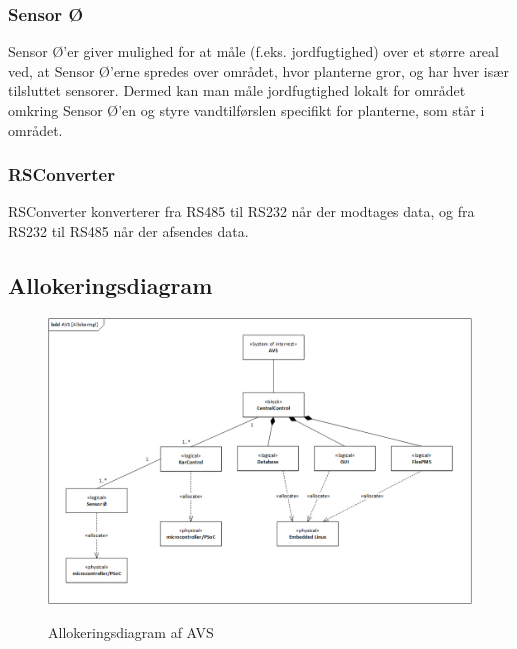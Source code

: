 \subsubsection{Sensor Ø}
Sensor Ø’er giver mulighed for at måle (f.eks. jordfugtighed) over et større areal ved, at Sensor Ø’erne spredes over området, hvor planterne gror, og har hver især tilsluttet sensorer. Dermed kan man måle jordfugtighed lokalt for området omkring Sensor Ø’en og styre vandtilførslen specifikt for planterne, som står i området.

\subsubsection{RSConverter}
RSConverter konverterer fra RS485 til RS232 når der modtages data, og fra RS232 til RS485 når der afsendes data.


\subsection{Allokeringsdiagram}

\begin{figure}[H]
	\centering
	\includegraphics[width=1\textwidth]{Systemarkitektur/System/AVS_Allokeringsdiagram.png}
	\label{fig:System BDD}
	\caption{Allokeringsdiagram af AVS}
\end{figure}







